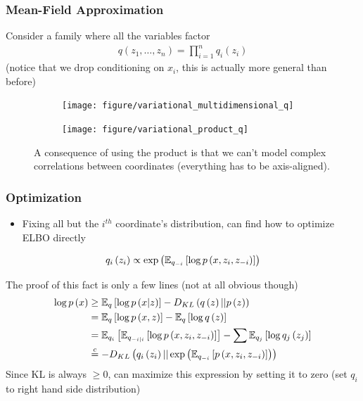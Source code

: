 \documentclass[10pt,mathserif]{beamer}
\begin{document}
\begin{frame}
  \frametitle{Mean-Field Approximation}
  Consider a family where all the variables factor
  \begin{align*}
    q\left(z_1, \dots, z_n\right) = \prod_{i = 1}^{n} q_{i}\left(z_i\right)
  \end{align*}
  (notice that we drop conditioning on $x_i$, this is actually more general than
  before)
  \begin{figure}[ht]
    \centering
    \begin{subfigure}{0.2\paperwidth}
      \texttt{[image: figure/variational\_multidimensional\_q]}
    \end{subfigure}
    \begin{subfigure}{0.2\paperwidth}
      \texttt{[image: figure/variational\_product\_q]}
    \end{subfigure}
    \caption{A consequence of using the product is that we can't model complex
      correlations between coordinates (everything has to be axis-aligned).
      \label{fig:variational_product_q}}
  \end{figure}
\end{frame}

\begin{frame}
  \frametitle{Optimization}
  \begin{itemize}
  \item Fixing all but the $i^{th}$ coordinate's distribution, can find how to
    optimize ELBO directly
  \end{itemize}
  \begin{align*}
q_i\left(z_i\right) \propto \operatorname{exp}\left(\mathbb{E}_{q_{-i}}\left[{\log p\left(x, z_i, z_{-i}\right)}\right]\right)
  \end{align*}
\end{frame}


\begin{frame}
  The proof of this fact is only a few lines (not at all obvious though)
  \begin{align*}
    \log p\left(x\right) &\geq
    \mathbb{E}_{q}\left[{\log p\left(x \vert z\right)}\right] - D_{KL}\left( q\left(z\right) \vert\vert p\left(z\right)\right) \\
    &= \mathbb{E}_{q}\left[{\log p\left(x, z\right)}\right] - \mathbb{E}_{q}\left[{\log q\left(z\right)}\right]\\
    &= \mathbb{E}_{q_i}\left[{\mathbb{E}_{q_{-i \vert i}}\left[{\log p\left(x, z_i, z_{-i}\right)}\right]}\right] - \sum \mathbb{E}_{q_j}\left[{\log q_j\left(z_j\right)}\right] \\
    &\stackrel{c}{=} -D_{KL}\left(q_{i}\left(z_i\right) \vert \vert \operatorname{exp}\left(\mathbb{E}_{q_{-i}}\left[{p\left(x, z_i, z_{-i}\right)}\right]\right)\right)
  \end{align*}
  Since KL is always $\geq 0$, can maximize this expression by setting it to zero
  (set $q_i$ to right hand side distribution)
\end{frame}
\end{document}
